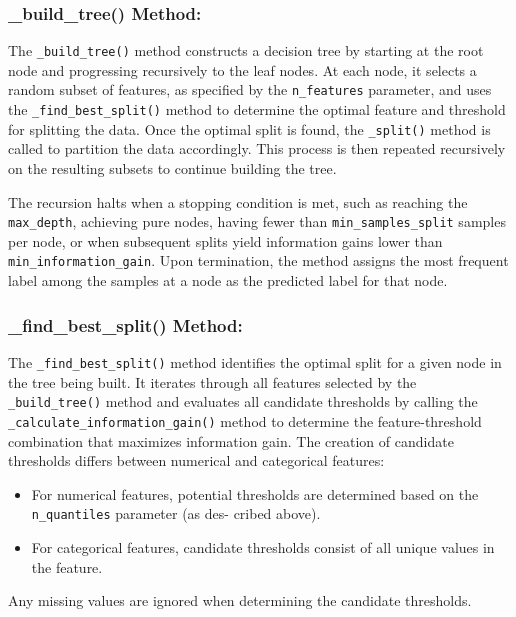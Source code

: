 \documentclass{article}
\begin{document}
\subsubsection*{\_build\_tree() Method:}

The \texttt{\_build\_tree()} method constructs a decision tree by starting at the root node and progressing recursively to the leaf nodes. At each node, it selects a random subset of features, as specified by the \texttt{n\_features} parameter, and uses the \texttt{\_find\_best\_split()} method to determine the optimal feature and threshold for splitting the data. Once the optimal split is found, the \texttt{\_split()} method is called to partition the data accordingly. This process is then repeated recursively on the resulting subsets to continue building the tree.

The recursion halts when a stopping condition is met, such as reaching the \texttt{max\_depth}, achieving pure nodes, having fewer than \texttt{min\_samples\_split} samples per node, or when subsequent splits yield information gains lower than \texttt{min\_information\_gain}. Upon termination, the method assigns the most frequent label among the samples at a node as the predicted label for that node.

\subsubsection*{\_find\_best\_split() Method:}

The \texttt{\_find\_best\_split()} method identifies the optimal split for a given node in the tree being built. It iterates through all features selected by the \texttt{\_build\_tree()} method and evaluates all candidate thresholds by calling the \texttt{\_calculate\_information\_gain()} method to determine the feature-threshold combination that maximizes information gain. The creation of candidate thresholds differs between numerical and categorical features:

\begin{itemize}
\item For numerical features, potential thresholds are determined based on the \texttt{n\_quantiles} parameter (as des- cribed above).
\item For categorical features, candidate thresholds consist of all unique values in the feature.
\end{itemize}

Any missing values are ignored when determining the candidate thresholds.
\end{document}
